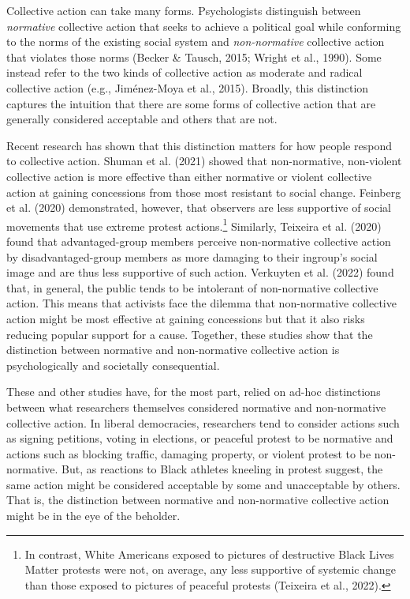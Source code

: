 \documentclass[twocolumn, 11pt, letterpaper]{article}
\begin{document}
Collective action can take many forms. Psychologists distinguish between
\emph{normative} collective action that seeks to achieve a political
goal while conforming to the norms of the existing social system and
\emph{non-normative} collective action that violates those norms (Becker
\& Tausch, 2015; Wright et al., 1990). Some instead refer to the two
kinds of collective action as moderate and radical collective action
(e.g., Jiménez-Moya et al., 2015). Broadly, this distinction captures
the intuition that there are some forms of collective action that are
generally considered acceptable and others that are not.

Recent research has shown that this distinction matters for how people
respond to collective action. Shuman et al. (2021) showed that
non-normative, non-violent collective action is more effective than
either normative or violent collective action at gaining concessions
from those most resistant to social change. Feinberg et al. (2020)
demonstrated, however, that observers are less supportive of social
movements that use extreme protest actions.\footnote{In contrast, White
  Americans exposed to pictures of destructive Black Lives Matter
  protests were not, on average, any less supportive of systemic change
  than those exposed to pictures of peaceful protests (Teixeira et al.,
  2022).} Similarly, Teixeira et al. (2020) found that advantaged-group
members perceive non-normative collective action by disadvantaged-group
members as more damaging to their ingroup's social image and are thus
less supportive of such action. Verkuyten et al. (2022) found that, in
general, the public tends to be intolerant of non-normative collective
action. This means that activists face the dilemma that non-normative
collective action might be most effective at gaining concessions but
that it also risks reducing popular support for a cause. Together, these
studies show that the distinction between normative and non-normative
collective action is psychologically and societally consequential.

These and other studies have, for the most part, relied on ad-hoc
distinctions between what researchers themselves considered normative
and non-normative collective action. In liberal democracies, researchers
tend to consider actions such as signing petitions, voting in elections,
or peaceful protest to be normative and actions such as blocking
traffic, damaging property, or violent protest to be non-normative. But,
as reactions to Black athletes kneeling in protest suggest, the same
action might be considered acceptable by some and unacceptable by
others. That is, the distinction between normative and non-normative
collective action might be in the eye of the beholder.
\end{document}
